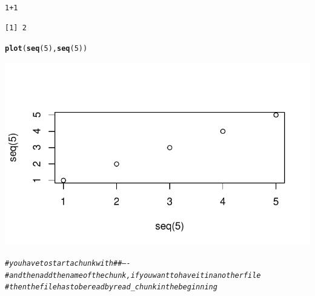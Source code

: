 \documentclass[a4paper,draft=false]{scrreprt}\usepackage[]{graphicx}\usepackage[]{color}
\makeatletter
\def\maxwidth{ %
  \ifdim\Gin@nat@width>\linewidth
    \linewidth
  \else
    \Gin@nat@width
  \fi
}
\newcommand{\hlnum}[1]{\textcolor[rgb]{0.686,0.059,0.569}{#1}}%
\newcommand{\hlcom}[1]{\textcolor[rgb]{0.678,0.584,0.686}{\textit{#1}}}%
\newcommand{\hlopt}[1]{\textcolor[rgb]{0,0,0}{#1}}%
\newcommand{\hlstd}[1]{\textcolor[rgb]{0.345,0.345,0.345}{#1}}%
\newcommand{\hlkwd}[1]{\textcolor[rgb]{0.737,0.353,0.396}{\textbf{#1}}}%
\newenvironment{kframe}{%
 \def\at@end@of@kframe{}%
 \ifinner\ifhmode%
  \def\at@end@of@kframe{\end{minipage}}%
  \begin{minipage}{\columnwidth}%
 \fi\fi%
 \def\FrameCommand##1{\hskip\@totalleftmargin \hskip-\fboxsep
 \colorbox{shadecolor}{##1}\hskip-\fboxsep
     \hskip-\linewidth \hskip-\@totalleftmargin \hskip\columnwidth}%
 \MakeFramed {\advance\hsize-\width
   \@totalleftmargin\z@ \linewidth\hsize
   \@setminipage}}%
 {\par\unskip\endMakeFramed%
 \at@end@of@kframe}
\newenvironment{knitrout}{}{} %
\makeatother
\begin{document}
\begin{knitrout}
\color{fgcolor}\begin{kframe}
\begin{alltt}
\hlnum{1} \hlopt{+} \hlnum{1}
\end{alltt}
\begin{verbatim}
[1] 2
\end{verbatim}
\begin{alltt}
\hlkwd{plot}\hlstd{(}\hlkwd{seq}\hlstd{(}\hlnum{5}\hlstd{),}\hlkwd{seq}\hlstd{(}\hlnum{5}\hlstd{))}
\end{alltt}
\end{kframe}
\includegraphics[width=\maxwidth]{figure/chunkname-1} 
\begin{kframe}\begin{alltt}
\hlcom{# you have to start a chunk with ## ----}
\hlcom{# and then add the name of the chunk, if you want to have it in another file}
\hlcom{# then the file has to be read by read_chunk in the beginning}
\end{alltt}
\end{kframe}
\end{knitrout}

\appendix
\appendixpage
\end{document}
